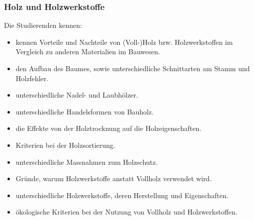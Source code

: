 \subsubsection*{Holz und Holzwerkstoffe}
Die Studierenden kennen: 

\begin{itemize}
	\item kennen Vorteile und Nachteile von (Voll-)Holz bzw. Holzwerkstoffen im Vergleich zu anderen Materialien im Bauwesen.
	\item den Aufbau des Baumes, sowie unterschiedliche Schnittarten am Stamm und Holzfehler.
	\item unterschiedliche Nadel- und Laubhölzer.
	\item unterschiedliche Handelsformen von Bauholz.
	\item die Effekte von der Holztrocknung auf die Holzeigenschaften.
	\item Kriterien bei der Holzsortierung.
	\item unterschiedliche Massnahmen zum Holzschutz.
	\item Gründe, warum Holzwerkstoffe anstatt Vollholz verwendet wird.
	\item unterschiedliche Holzwerkstoffe, deren Herstellung und Eigenschaften.
	\item ökologische Kriterien bei der Nutzung von Vollholz und Holzwerkstoffen.
\end{itemize}